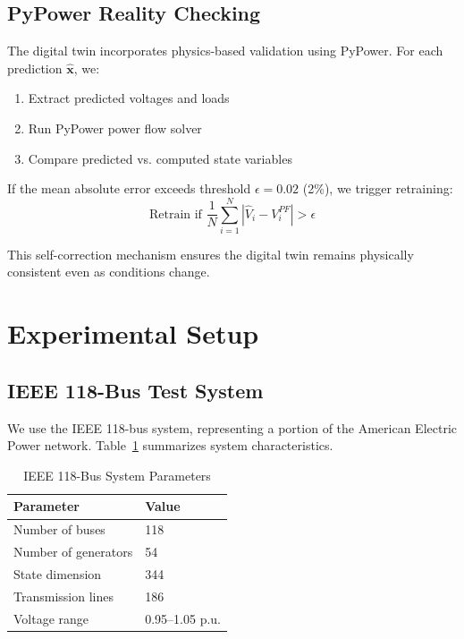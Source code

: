 \documentclass[journal,12pt,onecolumn]{IEEEtran}
\begin{document}
\subsection{PyPower Reality Checking}

The digital twin incorporates physics-based validation using PyPower. For each prediction $\hat{\mathbf{x}}$, we:
\begin{enumerate}
    \item Extract predicted voltages and loads
    \item Run PyPower power flow solver
    \item Compare predicted vs. computed state variables
\end{enumerate}

If the mean absolute error exceeds threshold $\epsilon = 0.02$ (2\%), we trigger retraining:
\begin{equation}
\text{Retrain if } \frac{1}{N} \sum_{i=1}^{N} |\hat{V}_i - V_i^{PF}| > \epsilon
\label{eq:reality_check}
\end{equation}

This self-correction mechanism ensures the digital twin remains physically consistent even as conditions change.

\section{Experimental Setup}
\label{sec:experimental}

\subsection{IEEE 118-Bus Test System}

We use the IEEE 118-bus system, representing a portion of the American Electric Power network. Table~\ref{tab:system} summarizes system characteristics.

\begin{table}[htbp]
\caption{IEEE 118-Bus System Parameters}
\label{tab:system}
\centering
\begin{tabular}{ll}
\toprule
\textbf{Parameter} & \textbf{Value} \\
\midrule
Number of buses & 118 \\
Number of generators & 54 \\
State dimension & 344 \\
Transmission lines & 186 \\
Voltage range & 0.95--1.05 p.u. \\
\bottomrule
\end{tabular}
\end{table}
\end{document}

